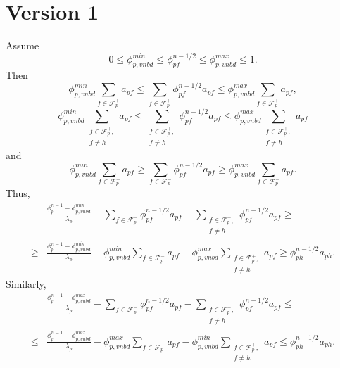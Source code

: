 \documentclass[../thesis.tex]{subfiles}
\begin{document}
\section{Version 1}
Assume
\[0 \leq \phi_{p,vnbd}^{min} \leq  \phi_{pf}^{n-1/2} \leq \phi_{p,vnbd}^{max} \leq 1.\]
Then
\[
	\phi_{p,vnbd}^{min} \sum_{f \in \mathcal{F}_p^+} a_{pf}
	\leq
	\sum_{f \in \mathcal{F}_p^+} \phi_{pf}^{n-1/2} a_{pf}
	\leq
	\phi_{p,vnbd}^{max} \sum_{f \in \mathcal{F}_p^+} a_{pf},
\]
\[
	\phi_{p,vnbd}^{min} \sum_{\substack{
			f \in \mathcal{F}_p^+, \\
			f \neq h}
			} a_{pf}
	\leq
	\sum_{\substack{
			f \in \mathcal{F}_p^+, \\
			f \neq h}
			} \phi_{pf}^{n-1/2} a_{pf}
	\leq
	\phi_{p,vnbd}^{max} \sum_{\substack{
			f \in \mathcal{F}_p^+, \\
			f \neq h}
			} a_{pf}
\]
and \[
	\phi_{p,vnbd}^{min} \sum_{f \in \mathcal{F}_p^-} a_{pf}
	\geq
	\sum_{f \in \mathcal{F}_p^-} \phi_{pf}^{n-1/2} a_{pf}
	\geq
	\phi_{p,vnbd}^{max} \sum_{f \in \mathcal{F}_p^-} a_{pf}.
	\]
Thus,
\begin{equation*}
	\begin{split}
		&\frac{\phi_p^{n-1} - \phi_{p,vnbd}^{min}}{\lambda_p}
		- \sum_{f \in \mathcal{F}_p^-} \phi_{pf}^{n-1/2} a_{pf}
		- \sum_{
			\substack{
				f \in \mathcal{F}_p^+, \\
				f \neq h}
				} \phi_{pf}^{n-1/2} a_{pf}
		\geq\\
		\geq
		&\frac{\phi_p^{n-1} - \phi_{p,vnbd}^{min}}{\lambda_p}
		- \phi_{p,vnbd}^{min}\sum_{f \in \mathcal{F}_p^-} a_{pf}
		- \phi_{p,vnbd}^{max}\sum_{
			\substack{
				f \in \mathcal{F}_p^+, \\
				f \neq h}
				} a_{pf}
		\geq
		\phi_{ph}^{n-1/2} a_{ph}.
	\end{split}
\end{equation*}
Similarly,
\begin{equation*}
	\begin{split}
		&\frac{\phi_p^{n-1} - \phi_{p,vnbd}^{max}}{\lambda_p}
		- \sum_{f \in \mathcal{F}_p^-} \phi_{pf}^{n-1/2} a_{pf}
		- \sum_{
			\substack{
				f \in \mathcal{F}_p^+, \\
				f \neq h}
				} \phi_{pf}^{n-1/2} a_{pf}
		\leq\\
		\leq
		&\frac{\phi_p^{n-1} - \phi_{p,vnbd}^{max}}{\lambda_p}
		- \phi_{p,vnbd}^{max}\sum_{f \in \mathcal{F}_p^-} a_{pf}
		- \phi_{p,vnbd}^{min}\sum_{
			\substack{
				f \in \mathcal{F}_p^+, \\
				f \neq h}
				} a_{pf}
		\leq
		\phi_{ph}^{n-1/2} a_{ph}.
	\end{split}
\end{equation*}
\end{document}
